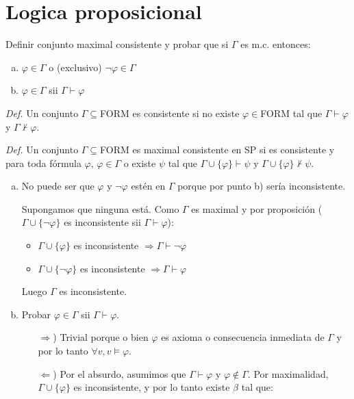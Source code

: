 \section{Logica proposicional}

\begin{questions}

\question Definir conjunto maximal consistente y probar que si $\Gamma$ es m.c. entonces: 

\begin{enumerate}[a)]
 \item $\varphi\in\Gamma$ o (exclusivo) $\neg\varphi\in\Gamma$
 \item $\varphi\in\Gamma$ sii $\Gamma\vdash\varphi$
\end{enumerate}

\begin{solution}

 {\it Def. } Un conjunto $\Gamma\subseteq$FORM es consistente si no existe $\varphi\in$FORM tal que $\Gamma\vdash\varphi$ y $\Gamma\nvdash\varphi$.
 
 {\it Def. } Un conjunto $\Gamma\subseteq$FORM es maximal consistente en SP si es consistente y para toda f\'ormula $\varphi$, $\varphi\in\Gamma$ o existe $\psi$ tal que $\Gamma\cup\{\varphi\}\vdash\psi$ y $\Gamma\cup\{\varphi\}\nvdash\psi$.

 \begin{enumerate}[a)]
  \item No puede ser que $\varphi$ y $\neg\varphi$ est\'en en $\Gamma$ porque por punto b) ser\'ia inconsistente.
  
  Supongamos que ninguna est\'a. Como $\Gamma$ es maximal y por proposici\'on ($\Gamma\cup\{\neg\varphi\}$ es inconsistente sii $\Gamma\vdash\varphi$): 
  
  \begin{itemize}
   \item $\Gamma\cup\{\varphi\}$ es inconsistente $\Rightarrow \Gamma\vdash\neg\varphi$
   \item $\Gamma\cup\{\neg\varphi\}$ es inconsistente $\Rightarrow \Gamma\vdash\varphi$
  \end{itemize}

  Luego $\Gamma$ es inconsistente.
  
  \item Probar $\varphi\in\Gamma$ sii $\Gamma\vdash\varphi$. 
  
  \begin{itemize}
   \item[$\Rightarrow$)] Trivial porque o bien $\varphi$ es axioma o consecuencia inmediata de $\Gamma$ y por lo tanto $\forall v, v\vDash\varphi$. 
   \item[$\Leftarrow$)] Por el absurdo, asumimos que $\Gamma\vdash\varphi$ y $\varphi\notin\Gamma$. Por maximalidad, $\Gamma\cup\{\varphi\}$ es inconsistente, y por lo tanto existe $\beta$ tal que:
   

\end{itemize}
\end{enumerate}
\end{solution}
\end{questions}

